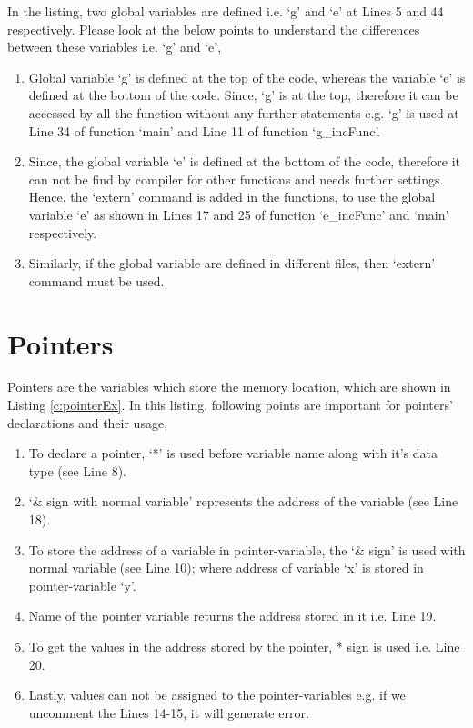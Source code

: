 \begin{explanation}
	In the listing, two global variables are defined i.e. `g' and `e' at Lines 5 and 44 respectively. Please look at the below points to understand the differences between these variables i.e. `g' and `e', 
	
	\begin{enumerate}
		\item Global variable `g' is defined at the top of the code, whereas the variable `e' is defined at the bottom of the code. Since, `g' is at the top, therefore it can be accessed by all the function without any further statements e.g. `g' is used at Line 34 of function `main' and Line 11 of function `g\_incFunc'. 
		
		\item Since, the global variable `e' is defined at the bottom of the code, therefore it can not be find by compiler for other functions and needs further settings. Hence, the `extern' command is added in the functions, to use the global variable `e' as shown in Lines 17 and 25 of function `e\_incFunc' and `main' respectively.	
		
		\item Similarly, if the global variable are defined in different files, then `extern' command must be used. 	
	\end{enumerate}
\end{explanation}


\section{Pointers} \label{sec:PointersBasic}
Pointers are the variables which store the memory location, which are shown in Listing \ref{c:pointerEx}. In this listing, following points are important for pointers' declarations and their usage, 

\begin{enumerate}
	\item To declare a pointer, `*' is used before variable name along with it's data type (see Line 8). 
	
	\item `$\&$ sign with normal variable' represents the address of the variable (see Line 18). 
	
	\item To store the address of a variable in pointer-variable, the `$\&$ sign' is used with normal variable (see Line 10); where address of variable `x' is stored in pointer-variable `y'. 
	
	\item Name of the pointer variable returns the address stored in it i.e. Line 19. 
	
	\item To get the values in the address stored by the pointer, * sign is used i.e. Line 20. 
	
	\item Lastly, values can not be assigned to the pointer-variables e.g. if we uncomment the Lines 14-15, it will generate error.  
\end{enumerate}

